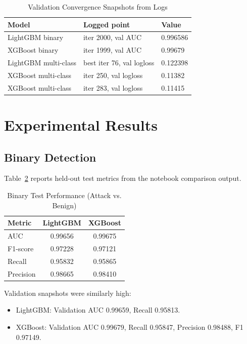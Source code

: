\documentclass[10pt,journal]{IEEEtran}
\begin{document}
\begin{table}[!t]
\caption{Validation Convergence Snapshots from Logs}
\label{tab:convergence}
\centering
\begin{tabular}{l l l}
\toprule
Model & Logged point & Value \\
\midrule
LightGBM binary & iter 2000, val AUC & 0.996586 \\
XGBoost binary & iter 1999, val AUC & 0.99679 \\
LightGBM multi-class & best iter 76, val logloss & 0.122398 \\
XGBoost multi-class & iter 250, val logloss & 0.11382 \\
XGBoost multi-class & iter 283, val logloss & 0.11415 \\
\bottomrule
\end{tabular}
\end{table}

\section{Experimental Results}
\subsection{Binary Detection}
Table~\ref{tab:binary_test} reports held-out test metrics from the notebook comparison output.

\begin{table}[!t]
\caption{Binary Test Performance (Attack vs. Benign)}
\label{tab:binary_test}
\centering
\begin{tabular}{l cc}
\toprule
Metric & LightGBM & XGBoost \\
\midrule
AUC & 0.99656 & 0.99675 \\
F1-score & 0.97228 & 0.97121 \\
Recall & 0.95832 & 0.95865 \\
Precision & 0.98665 & 0.98410 \\
\bottomrule
\end{tabular}
\end{table}

Validation snapshots were similarly high:
\begin{itemize}
\item LightGBM: Validation AUC 0.99659, Recall 0.95813.
\item XGBoost: Validation AUC 0.99679, Recall 0.95847, Precision 0.98488, F1 0.97149.
\end{itemize}
\end{document}
